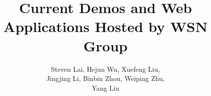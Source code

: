 \title{Current Demos and Web Applications Hosted by WSN Group}
\author{Steven Lai, Hejun Wu, Xuefeng Liu, \\
Jingjing Li, Binbin Zhou, Weiping Zhu, \\
Yang Liu}
\maketitle